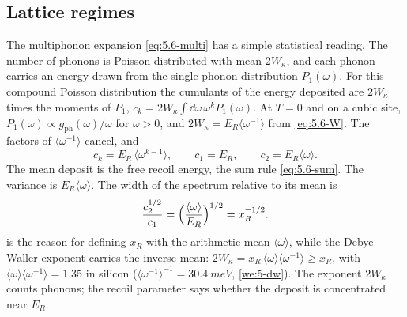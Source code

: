 \subsection{Lattice regimes}

The multiphonon expansion \cref{eq:5.6-multi} has a simple statistical reading. The number of phonons is Poisson distributed with mean $2W_\kappa$, and each phonon carries an energy drawn from the single-phonon distribution $P_1(\omega)$. For this compound Poisson distribution the cumulants of the energy deposited are $2W_\kappa$ times the moments of $P_1$, $c_k = 2W_\kappa\int\dd\omega\,\omega^kP_1(\omega)$. At $T = 0$ and on a cubic site, $P_1(\omega) \propto g_{\mathrm{ph}}(\omega)/\omega$ for $\omega > 0$, and $2W_\kappa = E_R\langle\omega^{-1}\rangle$ from \cref{eq:5.6-W}. The factors of $\langle\omega^{-1}\rangle$ cancel, and
\begin{equation}
  c_k = E_R\,\langle\omega^{k-1}\rangle , \qquad c_1 = E_R , \qquad c_2 = E_R\langle\omega\rangle .
  \label{eq:8.5-cumulants}
\end{equation}
The mean deposit is the free recoil energy, the sum rule \cref{eq:5.6-sum}. The variance is $E_R\langle\omega\rangle$. The width of the spectrum relative to its mean is
\begin{equation}
  \frac{c_2^{1/2}}{c_1} = \Bigl(\frac{\langle\omega\rangle}{E_R}\Bigr)^{1/2} = x_R^{-1/2} .
  \label{eq:8.5-width}
\end{equation}
 is the reason for defining $x_R$ with the arithmetic mean $\langle\omega\rangle$, while the Debye--Waller exponent carries the inverse mean: $2W_\kappa = x_R\,\langle\omega\rangle\langle\omega^{-1}\rangle \ge x_R$, with $\langle\omega\rangle\langle\omega^{-1}\rangle = 1.35$ in silicon ($\langle\omega^{-1}\rangle^{-1} = \SI{30.4}{meV}$, \cref{we:5-dw}). The exponent $2W_\kappa$ counts phonons; the recoil parameter says whether the deposit is concentrated near $E_R$.

